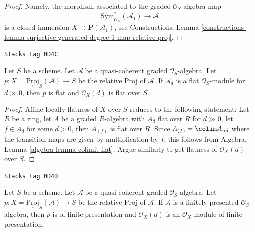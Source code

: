 \begin{proof}
Namely, the morphism associated to the graded $\mathcal{O}_S$-algebra map
$$
\text{Sym}_{\mathcal{O}_X}^*(\mathcal{A}_1)
\longrightarrow
\mathcal{A}
$$
is a closed immersion $X \to \mathbf{P}(\mathcal{A}_1)$, see
Constructions, Lemma
\ref{constructions-lemma-surjective-generated-degree-1-map-relative-proj}.
\end{proof}

\begin{lemma}
\label{divisors-lemma-relative-proj-flat}
\href{https://stacks.math.columbia.edu/tag/0D4C}{\texttt{Stacks tag 0D4C}}

Let $S$ be a scheme. Let $\mathcal{A}$ be a quasi-coherent graded
$\mathcal{O}_S$-algebra. Let
$p : X = \underline{\text{Proj}}_S(\mathcal{A}) \to S$ be the relative
Proj of $\mathcal{A}$. If $\mathcal{A}_d$ is a flat $\mathcal{O}_S$-module
for $d \gg 0$, then $p$ is flat and $\mathcal{O}_X(d)$ is
flat over $S$.
\end{lemma}

\begin{proof}
Affine locally flatness of $X$ over $S$ reduces to the following statement:
Let $R$ be a ring, let $A$ be a graded $R$-algebra with
$A_d$ flat over $R$ for $d \gg 0$, let $f \in A_d$
for some $d > 0$, then $A_{(f)}$ is flat over $R$.
Since $A_{(f)} = \colim A_{nd}$ where the transition maps
are given by multiplication by $f$, this follows from
Algebra, Lemma \ref{algebra-lemma-colimit-flat}.
Argue similarly to get flatness of $\mathcal{O}_X(d)$ over $S$.
\end{proof}

\begin{lemma}
\label{divisors-lemma-relative-proj-finite-presentation}
\href{https://stacks.math.columbia.edu/tag/0D4D}{\texttt{Stacks tag 0D4D}}

Let $S$ be a scheme. Let $\mathcal{A}$ be a quasi-coherent graded
$\mathcal{O}_S$-algebra. Let
$p : X = \underline{\text{Proj}}_S(\mathcal{A}) \to S$ be the relative
Proj of $\mathcal{A}$. If $\mathcal{A}$ is a finitely presented
$\mathcal{O}_S$-algebra, then $p$ is of finite presentation
and $\mathcal{O}_X(d)$ is an $\mathcal{O}_X$-module of finite presentation.
\end{lemma}

